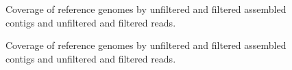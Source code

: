 \documentclass[11pt]{article} %
\begin{document}
\begin{landscape}
\begin{figure}[h!]
\caption{Coverage of reference genomes by unfiltered and filtered assembled contigs and unfiltered and filtered reads.}
\label{coverage1}
\end{figure}
\end{landscape}

\begin{landscape}
\begin{figure}[h!]
\caption{Coverage of reference genomes by unfiltered and filtered assembled contigs and unfiltered and filtered reads.}
\label{coverage2}
\end{figure}
\end{landscape}
\end{document}
